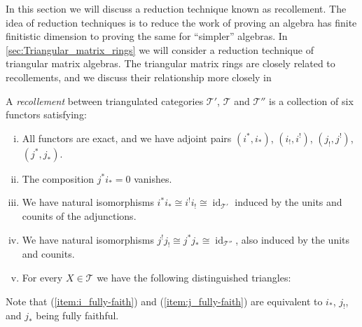 In this section we will discuss a reduction technique known as recollement. The idea of reduction techniques is to reduce the work of proving an algebra has finite finitistic dimension to proving the same for ``simpler'' algebras. In \cref{sec:Triangular_matrix_rings} we will consider a reduction technique of triangular matrix algebras. The triangular matrix rings are closely related to recollements, and we discuss their relationship more closely in 

\begin{defn}[Recollement]\label{def:recollement}
	A \emph{recollement} between triangulated categories $\mathcal T'$, $\mathcal T$ and $\mathcal T''$ is a collection of six functors satisfying:
\begin{center}
\end{center}

\begin{enumerate}[(i)]
	\item All functors are exact, and we have adjoint pairs $(i^*, i_*)$, $(i_!, i^!)$, $(j_!, j^!)$, $(j^*, j_*)$. 
	\item \label{recollement:vanishing_composition}The composition $j^*i_*=0$ vanishes.
	\item \label{item:i_fully-faith} 
	We have natural isomorphisms $i^*i_* \cong i^!i_! \cong \operatorname{id}_{\mathcal T'}$ induced by the units and counits of the adjunctions. 
	\item \label{item:j_fully-faith}
	We have natural isomorphisms $j^!j_! \cong j^*j_* \cong \operatorname{id}_{\mathcal T''}$, also induced by the units and counits. 
	\item \label{recollement:triangles}
	For every $X \in \mathcal T$ we have the following distinguished triangles:
	\begin{center}
	\end{center}
\end{enumerate}
Note that (\ref{item:i_fully-faith}) and (\ref{item:j_fully-faith}) are equivalent to $i_*$, $j_!$, and $j_*$ being fully faithful.
\end{defn}

